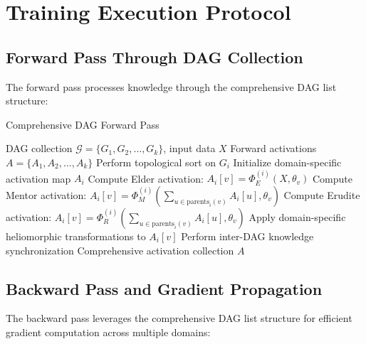 \section{Training Execution Protocol}

\subsection{Forward Pass Through DAG Collection}

The forward pass processes knowledge through the comprehensive DAG list structure:

\begin{algorithm}[H]
\caption{Comprehensive DAG Forward Pass}
\begin{algorithmic}[1]
\REQUIRE DAG collection $\mathcal{G} = \{G_1, G_2, \ldots, G_k\}$, input data $X$
\ENSURE Forward activations $A = \{A_1, A_2, \ldots, A_k\}$
    \STATE Perform topological sort on $G_i$
    \STATE Initialize domain-specific activation map $A_i$
            \STATE Compute Elder activation: $A_i[v] = \Phi_E^{(i)}(X, \theta_v)$
            \STATE Compute Mentor activation: $A_i[v] = \Phi_M^{(i)}(\sum_{u \in \text{parents}_i(v)} A_i[u], \theta_v)$
            \STATE Compute Erudite activation: $A_i[v] = \Phi_R^{(i)}(\sum_{u \in \text{parents}_i(v)} A_i[u], \theta_v)$
        \ENDIF
        \STATE Apply domain-specific heliomorphic transformations to $A_i[v]$
    \ENDFOR
\ENDFOR
\STATE Perform inter-DAG knowledge synchronization
\RETURN Comprehensive activation collection $A$
\end{algorithmic}
\end{algorithm}

\subsection{Backward Pass and Gradient Propagation}

The backward pass leverages the comprehensive DAG list structure for efficient gradient computation across multiple domains:

